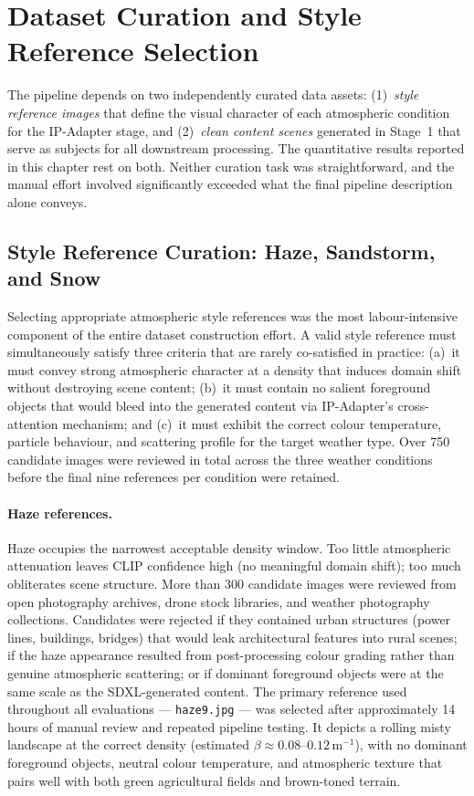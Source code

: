 \FloatBarrier
\section{Dataset Curation and Style Reference Selection}
\label{sec:dataset_curation}

\noindent The pipeline depends on two independently curated data assets: (1)~\emph{style reference images} that define the visual character of each atmospheric condition for the IP-Adapter stage, and (2)~\emph{clean content scenes} generated in Stage~1 that serve as subjects for all downstream processing. The quantitative results reported in this chapter rest on both. Neither curation task was straightforward, and the manual effort involved significantly exceeded what the final pipeline description alone conveys.

\subsection{Style Reference Curation: Haze, Sandstorm, and Snow}
\label{sec:style_ref_curation}

\noindent Selecting appropriate atmospheric style references was the most labour-intensive component of the entire dataset construction effort. A valid style reference must simultaneously satisfy three criteria that are rarely co-satisfied in practice: (a)~it must convey strong atmospheric character at a density that induces domain shift without destroying scene content; (b)~it must contain no salient foreground objects that would bleed into the generated content via IP-Adapter's cross-attention mechanism; and (c)~it must exhibit the correct colour temperature, particle behaviour, and scattering profile for the target weather type. Over 750 candidate images were reviewed in total across the three weather conditions before the final nine references per condition were retained.

\paragraph{Haze references.}
Haze occupies the narrowest acceptable density window. Too little atmospheric attenuation leaves CLIP confidence high (no meaningful domain shift); too much obliterates scene structure. More than 300 candidate images were reviewed from open photography archives, drone stock libraries, and weather photography collections. Candidates were rejected if they contained urban structures (power lines, buildings, bridges) that would leak architectural features into rural scenes; if the haze appearance resulted from post-processing colour grading rather than genuine atmospheric scattering; or if dominant foreground objects were at the same scale as the SDXL-generated content. The primary reference used throughout all evaluations --- \texttt{haze9.jpg} --- was selected after approximately 14 hours of manual review and repeated pipeline testing. It depicts a rolling misty landscape at the correct density (estimated $\beta \approx 0.08$--$0.12$\,m$^{-1}$), with no dominant foreground objects, neutral colour temperature, and atmospheric texture that pairs well with both green agricultural fields and brown-toned terrain.

